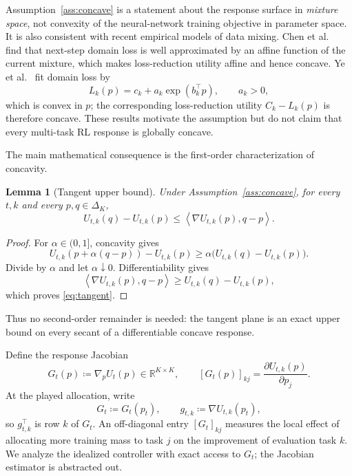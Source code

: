 \documentclass[11pt]{article}
\newtheorem{lemma}{Lemma}
\newcommand{\R}{\mathbb{R}}
\newcommand{\DeltaK}{\Delta_K}
\newcommand{\ip}[2]{\left\langle #1,#2\right\rangle}
\begin{document}
Assumption~\ref{ass:concave} is a statement about the response surface in \emph{mixture space}, not convexity of the neural-network training objective in parameter space. It is also consistent with recent empirical models of data mixing. Chen et al.~\cite{chen2025aioli} find that next-step domain loss is well approximated by an affine function of the current mixture, which makes loss-reduction utility affine and hence concave. Ye et al.~\cite{ye2025mixing} fit domain loss by
\[
    L_k(p)=c_k+a_k\exp(b_k^\top p),\qquad a_k>0,
\]
which is convex in $p$; the corresponding loss-reduction utility $C_k-L_k(p)$ is therefore concave. These results motivate the assumption but do not claim that every multi-task RL response is globally concave.

The main mathematical consequence is the first-order characterization of concavity.

\begin{lemma}[Tangent upper bound]
\label{lem:tangent}
Under Assumption~\ref{ass:concave}, for every $t,k$ and every $p,q\in\DeltaK$,
\begin{equation}
    U_{t,k}(q)-U_{t,k}(p)
    \le
    \ip{\nabla U_{t,k}(p)}{q-p}.
    \label{eq:tangent}
\end{equation}
\end{lemma}

\begin{proof}
For $\alpha\in(0,1]$, concavity gives
\[
    U_{t,k}(p+\alpha(q-p))-U_{t,k}(p)
    \ge
    \alpha\bigl(U_{t,k}(q)-U_{t,k}(p)\bigr).
\]
Divide by $\alpha$ and let $\alpha\downarrow0$. Differentiability gives
\[
    \ip{\nabla U_{t,k}(p)}{q-p}
    \ge
    U_{t,k}(q)-U_{t,k}(p),
\]
which proves \eqref{eq:tangent}.
\end{proof}

Thus no second-order remainder is needed: the tangent plane is an exact upper bound on every secant of a differentiable concave response.

Define the response Jacobian
\begin{equation}
    G_t(p)
    \coloneqq
    \nabla_p U_t(p)\in\R^{K\times K},
    \qquad
    [G_t(p)]_{kj}
    =\frac{\partial U_{t,k}(p)}{\partial p_j}.
    \label{eq:G}
\end{equation}
At the played allocation, write
\[
    G_t\coloneqq G_t(p_t),
    \qquad
    g_{t,k}\coloneqq \nabla U_{t,k}(p_t),
\]
so $g_{t,k}^\top$ is row $k$ of $G_t$. An off-diagonal entry $[G_t]_{kj}$ measures the local effect of allocating more training mass to task $j$ on the improvement of evaluation task $k$. We analyze the idealized controller with exact access to $G_t$; the Jacobian estimator is abstracted out.
\end{document}
